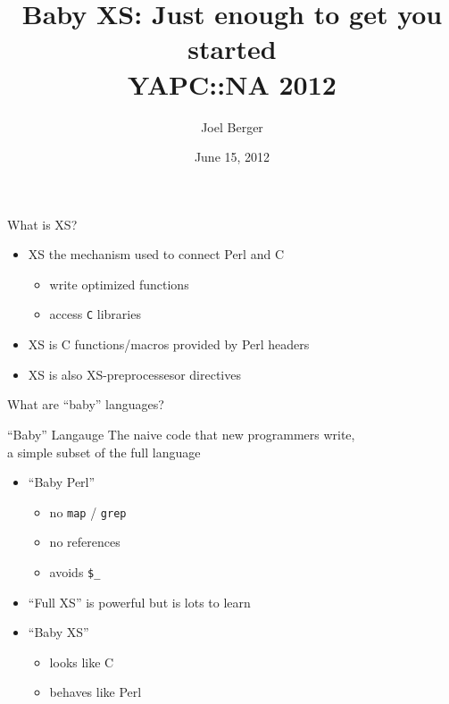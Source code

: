 \documentclass{beamer}
\title[Baby XS]{Baby XS: Just enough to get you started\\YAPC::NA 2012}
\author{Joel Berger}
\institute[UIC]{University of Illinois at Chicago}
\date{June 15, 2012}
\providecommand{\code}[1]{{\texttt{\scriptsize{#1}}}}
\begin{document}
\begin{frame}
  \maketitle
  \insertlogo
\end{frame}

\begin{frame}{What is XS?}
  \begin{itemize}
    \item XS the mechanism used to connect Perl and C
      \begin{itemize}
        \item write optimized functions
        \item access \code{C} libraries
      \end{itemize}
  \end{itemize}
  \vfill
  \vfill
  \begin{itemize}
    \item XS is C functions/macros provided by Perl headers
    \item XS is also XS-preprocessesor directives
  \end{itemize}
\end{frame}

\begin{frame}{What are ``baby'' languages?}
  \begin{block}{``Baby'' Langauge}
    The naive code that new programmers write,\\a simple subset of the full language
  \end{block}
  \begin{itemize}
    \item ``Baby Perl''
      \begin{itemize}
        \item no \code{map} / \code{grep}
        \item no references
        \item avoids \code{\$\_}
      \end{itemize}
    \item ``Full XS'' is powerful but is lots to learn
    \item ``Baby XS'' 
     \begin{itemize}
       \item looks like C
       \item behaves like Perl
     \end{itemize}
  \end{itemize}
\end{frame}
\end{document}

